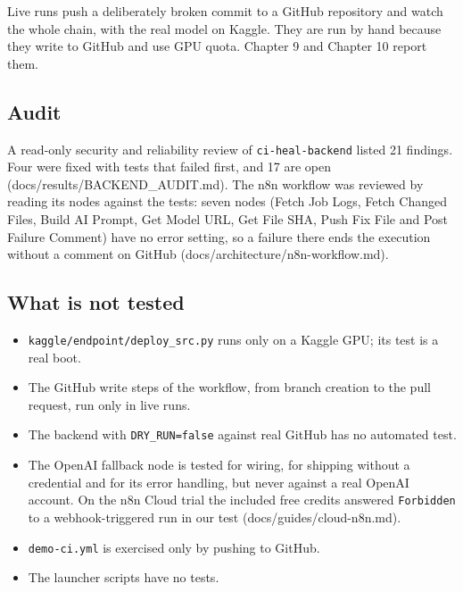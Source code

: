 Live runs push a deliberately broken commit to a GitHub repository and watch the whole chain, with the real model on Kaggle. They are run by hand because they write to GitHub and use GPU quota. Chapter 9 and Chapter 10 report them.

\subsection{Audit}

A read-only security and reliability review of \texttt{ci-\allowbreak{}heal-\allowbreak{}backend} listed 21 findings. Four were fixed with tests that failed first, and 17 are open (docs/\allowbreak{}results/\allowbreak{}BACKEND\_\allowbreak{}AUDIT.md). The n8n workflow was reviewed by reading its nodes against the tests: seven nodes (Fetch Job Logs, Fetch Changed Files, Build AI Prompt, Get Model URL, Get File SHA, Push Fix File and Post Failure Comment) have no error setting, so a failure there ends the execution without a comment on GitHub (docs/\allowbreak{}architecture/\allowbreak{}n8n-workflow.md).

\subsection{What is not tested}

\begin{itemize}[leftmargin=*, itemsep=2pt]
\item \texttt{kaggle/\allowbreak{}endpoint/\allowbreak{}deploy\_\allowbreak{}src.\allowbreak{}py} runs only on a Kaggle GPU; its test is a real boot.
\item The GitHub write steps of the workflow, from branch creation to the pull request, run only in live runs.
\item The backend with \texttt{DRY\_\allowbreak{}RUN=false} against real GitHub has no automated test.
\item The OpenAI fallback node is tested for wiring, for shipping without a credential and for its error handling, but never against a real OpenAI account. On the n8n Cloud trial the included free credits answered \texttt{Forbidden} to a webhook-triggered run in our test (docs/\allowbreak{}guides/\allowbreak{}cloud-n8n.md).
\item \texttt{demo-\allowbreak{}ci.\allowbreak{}yml} is exercised only by pushing to GitHub.
\item The launcher scripts have no tests.
\end{itemize}

